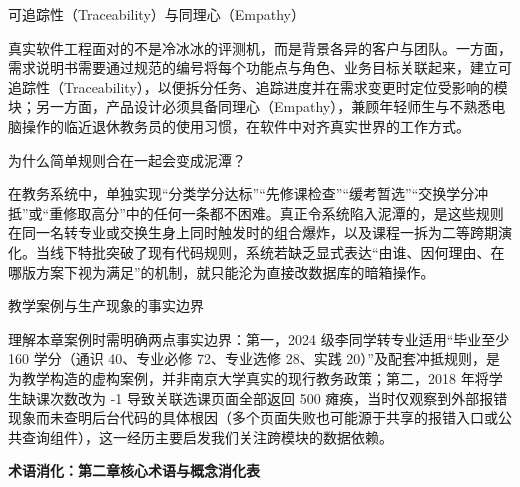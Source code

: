 \documentclass[UTF8,a4paper,11pt,fontset=fandol]{ctexart}
\begin{document}
\begin{importantbox}{可追踪性（Traceability）与同理心（Empathy）}

真实软件工程面对的不是冷冰冰的评测机，而是背景各异的客户与团队。一方面，需求说明书需要通过规范的编号将每个功能点与角色、业务目标关联起来，建立可追踪性（Traceability），以便拆分任务、追踪进度并在需求变更时定位受影响的模块；另一方面，产品设计必须具备同理心（Empathy），兼顾年轻师生与不熟悉电脑操作的临近退休教务员的使用习惯，在软件中对齐真实世界的工作方式。

\end{importantbox}

\begin{knowledgebox}{为什么简单规则合在一起会变成泥潭？}

在教务系统中，单独实现“分类学分达标”“先修课检查”“缓考暂选”“交换学分冲抵”或“重修取高分”中的任何一条都不困难。真正令系统陷入泥潭的，是这些规则在同一名转专业或交换生身上同时触发时的组合爆炸，以及课程一拆为二等跨期演化。当线下特批突破了现有代码规则，系统若缺乏显式表达“由谁、因何理由、在哪版方案下视为满足”的机制，就只能沦为直接改数据库的暗箱操作。

\end{knowledgebox}

\begin{warningbox}{教学案例与生产现象的事实边界}

理解本章案例时需明确两点事实边界：第一，2024 级李同学转专业适用“毕业至少 160 学分（通识 40、专业必修 72、专业选修 28、实践 20）”及配套冲抵规则，是为教学构造的虚构案例，并非南京大学真实的现行教务政策；第二，2018 年将学生缺课次数改为 -1 导致关联选课页面全部返回 500 瘫痪，当时仅观察到外部报错现象而未查明后台代码的具体根因（多个页面失败也可能源于共享的报错入口或公共查询组件），这一经历主要启发我们关注跨模块的数据依赖。

\end{warningbox}

\par{}\textbf{术语消化：第二章核心术语与概念消化表}
\end{document}

